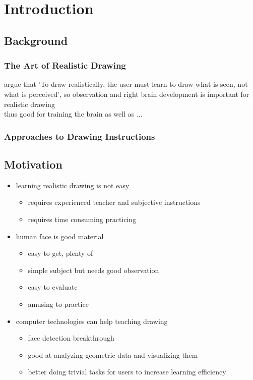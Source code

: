 \chapter{Introduction}\label{sec-introduction}

\section{Background}

		\subsection{The Art of Realistic Drawing}
				
				argue that 'To draw realistically, the user must learn to draw what is seen, not what is perceived', so observation and right brain development is important for realistic drawing \\
				
				thus good for training the brain as well as ...\\
					
		\subsection{Approaches to Drawing Instructions}
		
\section{Motivation}

		\begin{itemize}
			\item learning realistic drawing is not easy
				\begin{itemize}
					\item requires experienced teacher and subjective instructions
					\item requires time consuming practicing
				\end{itemize}
				
			\item human face is good material
				\begin{itemize}
					\item easy to get, plenty of
					\item simple subject but needs good observation 
					\item easy to evaluate
					\item amusing to practice
				\end{itemize}
				
			\item computer technologies can help teaching drawing
				\begin{itemize}
					\item face detection breakthrough
					\item good at analyzing geometric data and visualizing them
					\item better doing trivial tasks for users to increase learning efficiency
				\end{itemize}
		\end{itemize}
		
